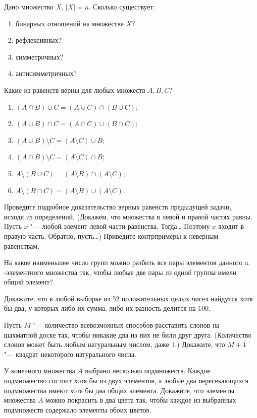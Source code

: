 \begin{problems}
\item Дано множество $X$, $|X|=n$. Сколько существует:
\begin{enumerate}
\item  бинарных отношений на множестве $X$?
\item рефлексивных?
\item симметричных?
\item антисимметричных?
\end{enumerate}

\item Какие из равенств верны для любых множеств $A,B,C$?
\begin{enumerate}
  \item $(A\cap B)\cup C=(A\cup C)\cap(B\cup C)$;
  \item $(A\cup B)\cap C=(A\cap C)\cup(B\cap C)$;
  \item $(A\cup B)\setminus C=(A\setminus C)\cup B$;
  \item $(A\cap B)\setminus C=(A\setminus C)\cap B$;
  \item $A\setminus(B\cup C)=(A\setminus B)\cap(A\setminus C)$;
  \item $A\setminus(B\cap C)=(A\setminus B)\cup(A\setminus C)$.
\end{enumerate}

\item Проведите подробное доказательство верных равенств предыдущей задачи, исходя из определений. (Докажем, что множества в левой и правой частях равны. Пусть $x$ "--- любой элемент левой части равенства. Тогда\ldots{} Поэтому $x$ входит в правую часть. Обратно, пусть\ldots) Приведите контрпримеры к неверным равенствам.

\item На какое наименьшее число групп можно разбить все пары элементов данного $n$-элементного множества так, чтобы любые две пары из одной группы имели общий элемент?

\item Докажите, что в любой выборке из 52 положительных целых чисел найдутся хотя бы два, у которых либо их сумма, либо их разность делится на 100.
 
\item Пусть $M$ "--- количество всевозможных способов расставить слонов на шахматной доске так, чтобы никакие два из них не били друг друга. (Количество слонов может быть любым натуральным числом, даже 1.) Докажите, что $M+1$ "--- квадрат некоторого натурального числа.
 
\item У конечного множества $A$ выбрано несколько подмножеств. Каждое подмножество состоит хотя бы из двух элементов, а любые два пересекающихся подмножества имеют хотя бы два общих элемента. Докажите, что элементы множества $A$ можно покрасить в два цвета так, чтобы каждое из выбранных подмножеств содержало элементы обоих цветов.


\end{problems}
